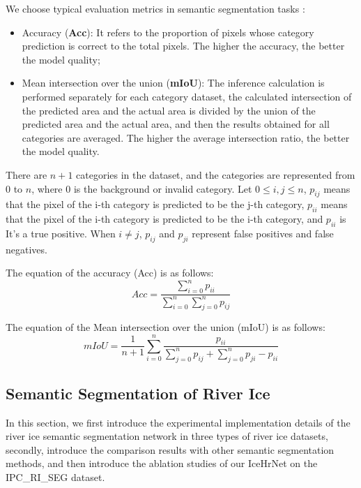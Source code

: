 \documentclass[a4paper,fleqn]{cas-dc}
\begin{document}
We choose typical evaluation metrics in semantic segmentation tasks \cite{Long_Shelhamer_Darrell_2015}:
\begin{itemize}
	\item Accuracy (\textbf{Acc}): It refers to the proportion of pixels whose category prediction is correct to the total pixels. The higher the accuracy, the better the model quality;
	\item Mean intersection over the union (\textbf{mIoU}): The inference calculation is performed separately for each category dataset, the calculated intersection of the predicted area and the actual area is divided by the union of the predicted area and the actual area, and then the results obtained for all categories are averaged. The higher the average intersection ratio, the better the model quality.
\end{itemize}

There are $n+1$ categories in the dataset, and the categories are represented from $0$ to $n$, where $0$ is the background or invalid category. Let $0 \le i,j \le n$, $p_{ij}$ means that the pixel of the i-th category is predicted to be the j-th category, $p_{ii}$ means that the pixel of the i-th category is predicted to be the i-th category, and $p_{ii}$ is It's a true positive. When $i \neq j$, $p_{ij}$ and $p_{ji}$ represent false positives and false negatives.

The equation of the accuracy (Acc) is as follows:
\begin{equation}
	Acc = \frac{ {\textstyle \sum_{i=0}^{n}p_{ii}} }{ {\textstyle \sum_{i=0}^{n}} {\textstyle \sum_{j=0}^{n}}p_{ij}  } 
	\label{equation1}
\end{equation}

The equation of the Mean intersection over the union (mIoU) is as follows:
\begin{equation}
	mIoU = \frac{1}{n+1} {\textstyle \sum_{i=0}^{n}}\frac{p_{ii}}{ {\textstyle \sum_{j=0}^{n}p_{ij}}+{\textstyle \sum_{j=0}^{n}p_{ji}}-p_{ii}}  
	\label{equation2}
\end{equation}

\subsection{Semantic Segmentation of River Ice}

In this section, we first introduce the experimental implementation details of the river ice semantic segmentation network in three types of river ice datasets, secondly, introduce the comparison results with other semantic segmentation methods, and then introduce the ablation studies of our IceHrNet on the IPC\_RI\_SEG dataset.
\end{document}
